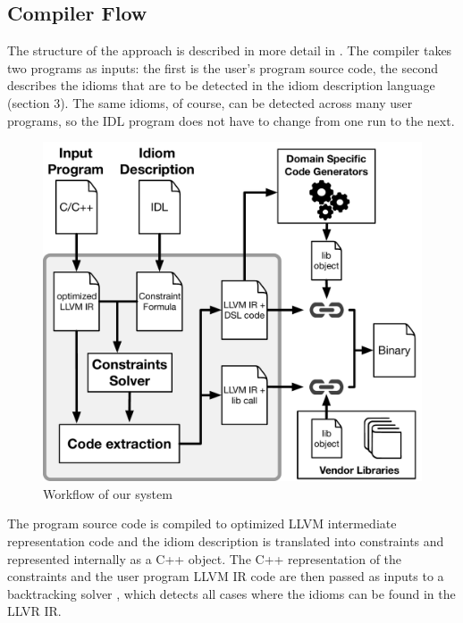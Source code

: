 \subsection{Compiler Flow}

    The structure of the approach is described in more detail in
    .
    The compiler takes two programs as inputs: the first is the user's program
    source code, the second describes the idioms that are to be detected in the
    idiom description language (section 3).
    The same idioms, of course, can be detected across many user programs, so
    the IDL program does not have to change from one run to the next.

\begin{figure}[t]
    \centering
    \includegraphics[width=\linewidth]{figures/compiler_flow.pdf}
    \caption{Workflow of our system}
    \label{fig:methodology}
    \vspace{-0.5em}
\end{figure}

    The program source code is compiled to optimized LLVM intermediate
    representation code and the idiom description is translated into constraints
    and represented internally as a C++ object.
    The C++ representation of the constraints and the user program LLVM IR code
    are then passed as inputs to a backtracking solver
    \cite{ginsbach2017discovery}, which detects all cases where the idioms can
    be found in the LLVR IR.

